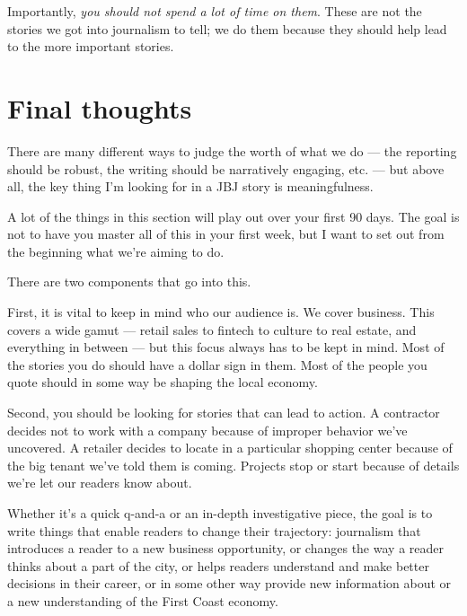 \documentclass[
  11pt,
  american,
  letterpaperpaper,
  extrafontsizes,onecolumn,openright
  ]{memoir}
\begin{document}
Importantly, \emph{you should not spend a lot of time on them}. These are not the stories we got into journalism to tell; we do them because they should help lead to the more important stories.

\hypertarget{final-thoughts}{%
\section*{Final thoughts}\label{final-thoughts}}

There are many different ways to judge the worth of what we do --- the reporting should be robust, the writing should be narratively engaging, etc. --- but above all, the key thing I'm looking for in a JBJ story is meaningfulness.

\leavevmode{}%
\begin{greybox}[frametitle=Onboarding Path]
A lot of the things in this section will play out over your first 90 days. The goal is not to have you master all of this in your first week, but I want to set out from the beginning what we're aiming to do.

\end{greybox}

There are two components that go into this.

First, it is vital to keep in mind who our audience is. We cover business. This covers a wide gamut --- retail sales to fintech to culture to real estate, and everything in between --- but this focus always has to be kept in mind. Most of the stories you do should have a dollar sign in them. Most of the people you quote should in some way be shaping the local economy.

Second, you should be looking for stories that can lead to action. A contractor decides not to work with a company because of improper behavior we've uncovered. A retailer decides to locate in a particular shopping center because of the big tenant we've told them is coming. Projects stop or start because of details we're let our readers know about.

Whether it's a quick q-and-a or an in-depth investigative piece, the goal is to write things that enable readers to change their trajectory: journalism that introduces a reader to a new business opportunity, or changes the way a reader thinks about a part of the city, or helps readers understand and make better decisions in their career, or in some other way provide new information about or a new understanding of the First Coast economy.
\end{document}

